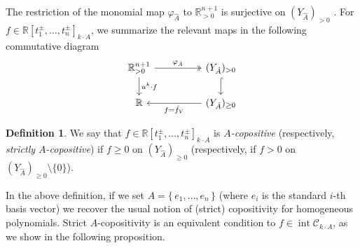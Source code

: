 \documentclass[a4paper,11pt]{amsart}
\theoremstyle{definition}
\newtheorem{definition}[theorem]{Definition}
\DeclareMathOperator{\interior}{int}
\newcommand{\RR}{\mathbb{R}}
\begin{document}
The restriction of the monomial map $\varphi_{\hat{A}}$ to $\RR^{n+1}_{>0}$ is surjective on $(Y_{\hat{A}})_{>0}$ \cite[Proposition 5.1.3]{TelenBook}. 
For $f \in \RR[t_1^\pm, \dots , t_n^\pm]_{k\cdot A}$, we summarize the relevant maps in the following commutative diagram
\begin{equation}
     \label{eq:ftildeCD}
                  \begin{tikzcd}
\RR_{>0}^{n+1}\arrow[rr,two heads,"\varphi_{\hat{A}}"]\arrow[d,"u^k \cdot f"] & & (Y_{\hat{A}})_{>0}\arrow[d,hookrightarrow] \\
           \RR  & & \arrow[ll,"f = \hat{f}_V"] (Y_{\hat{A}})_{\geq0}
         \end{tikzcd}
     \end{equation}
\begin{definition}
    We say that $f \in \RR[t_1^\pm,\ldots,t_n^\pm]_{k \cdot A}$ is \emph{$A$-copositive} (respectively, \emph{strictly $A$-copositive}) if $f \ge 0$ on $(Y_{\hat{A}})_{\geq0}$ (respectively, if $f > 0$ on $(Y_{\hat{A}})_{\geq0} \setminus \{ 0 \}$).
\end{definition}
In the above definition, if we set $A = \{\,e_1,  \dots , e_n\, \}$ (where $e_i$ is the standard $i$-th basis vector) we recover the usual notion of (strict) copositivity for homogeneous polynomials.
Strict $A$-copositivity is an equivalent condition to $f \in \interior \mathcal{C}_{k\cdot A}$, as we show in the following proposition.
\end{document}
